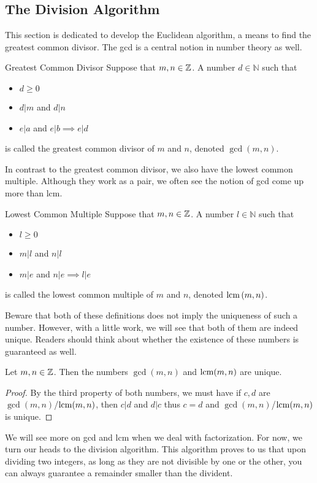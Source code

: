 \documentclass[a4paper]{article}
\begin{document}
\subsection{The Division Algorithm}
This section is dedicated to develop the Euclidean algorithm, a means to find the greatest common divisor. The gcd is a central notion in number theory as well. 
\begin{defn}{Greatest Common Divisor}{} Suppose that $m,n\in\mathbb{Z}$. A number $d\in\mathbb{N}$ such that 
\begin{itemize}
\item $d\geq 0$
\item $d|m$ and $d|n$
\item $e|a$ and $e|b\implies e|d$
\end{itemize}
is called the greatest common divisor of $m$ and $n$, denoted $\gcd{(m,n)}$.
\end{defn}

In contrast to the greatest common divisor, we also have the lowest common multiple. Although they work as a pair, we often see the notion of gcd come up more than lcm. 

\begin{defn}{Lowest Common Multiple}{} Suppose that $m,n\in\mathbb{Z}$. A number $l\in\mathbb{N}$ such that 
\begin{itemize}
\item $l\geq 0$
\item $m|l$ and $n|l$
\item $m|e$ and $n|e\implies l|e$
\end{itemize}
is called the lowest common multiple of $m$ and $n$, denoted $\operatorname{lcm}{(m,n)}$.
\end{defn}

Beware that both of these definitions does not imply the uniqueness of such a number. However, with a little work, we will see that both of them are indeed unique. Readers should think about whether the existence of these numbers is guaranteed as well. 

\begin{prp}{}{} Let $m,n\in\mathbb{Z}$. Then the numbers $\gcd(m,n)$ and $\operatorname{lcm}(m,n)$ are unique. 
\end{prp}
\begin{proof}
By the third property of both numbers, we must have if $c,d$ are $\gcd(m,n)$/$\operatorname{lcm}(m,n)$, then $c|d$ and $d|c$ thus $c=d$ and $\gcd(m,n)$/$\operatorname{lcm}(m,n)$ is unique. 
\end{proof}

We will see more on gcd and lcm when we deal with factorization. For now, we turn our heads to the division algorithm. This algorithm proves to us that upon dividing two integers, as long as they are not divisible by one or the other, you can always guarantee a remainder smaller than the divident. 
\end{document}
